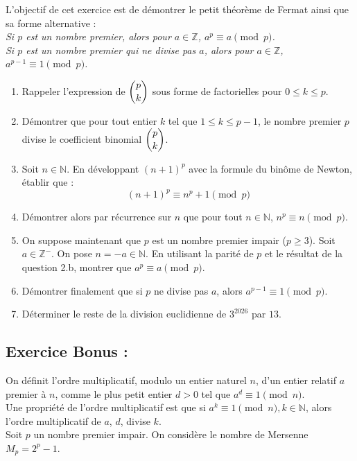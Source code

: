 \documentclass[12pt,a4paper]{article}
\begin{document}
L'objectif de cet exercice est de démontrer le petit théorème de Fermat ainsi que sa forme alternative : \\
\textit{Si $p$ est un nombre premier, alors pour $a \in \mathbb{Z}$, $a^p \equiv a \pmod p$.}\\
\textit{Si $p$ est un nombre premier qui ne divise pas $a$, alors pour $a \in \mathbb{Z}$, $a^{p-1} \equiv 1 \pmod p$.}

    \begin{enumerate}
        \item Rappeler l'expression de $\dbinom{p}{k}$ sous forme de factorielles pour $0 \le k \le p$.
        \item Démontrer que pour tout entier $k$ tel que $1 \le k \le p-1$, le nombre premier $p$ divise le coefficient binomial $\dbinom{p}{k}$.
        \item Soit $n \in \mathbb{N}$. En développant $(n+1)^p$ avec la formule du binôme de Newton, établir que :
        \[ (n+1)^p \equiv n^p + 1 \pmod p \]
        \item Démontrer alors par récurrence sur $n$ que pour tout $n \in \mathbb{N}$, $n^p \equiv n \pmod p$.
        \item On suppose maintenant que $p$ est un nombre premier impair ($p \ge 3$). Soit $a \in \mathbb{Z}^-$. On pose $n = -a \in \mathbb{N}$. 
        En utilisant la parité de $p$ et le résultat de la question 2.b, montrer que $a^p \equiv a \pmod p$.
    \end{enumerate}
    
    \begin{enumerate}
        \setcounter{enumi}{5}
        \item Démontrer finalement que si $p$ ne divise pas $a$, alors $a^{p-1} \equiv 1 \pmod p$. 
        \item Déterminer le reste de la division euclidienne de $3^{2026}$ par $13$.
    \end{enumerate}




\subsection*{Exercice Bonus :}

On définit l'ordre multiplicatif, modulo un entier naturel $n$, d'un entier relatif $a$ premier à $n$, comme le plus petit entier $d > 0$ tel que $a^d \equiv 1 \pmod n$.\\
Une propriété de l'ordre multiplicatif est que si $a^k \equiv 1 \pmod n, k \in \mathbb{N}$, alors l'ordre multiplicatif de $a$, $d$, divise $k$. \\
Soit $p$ un nombre premier impair. On considère le nombre de Mersenne $M_p = 2^p - 1$.
\end{document}
